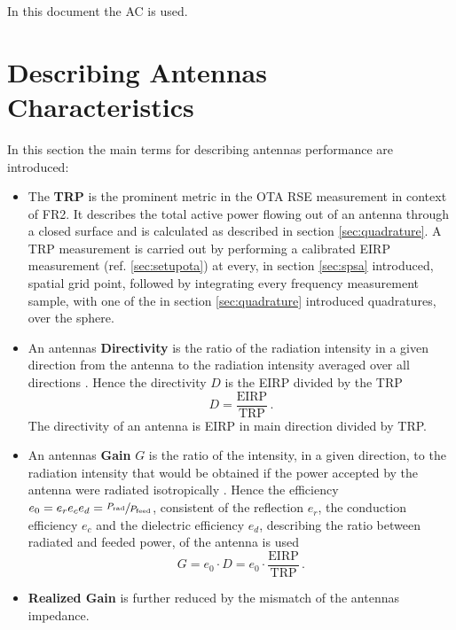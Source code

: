 In this document the \ac{AC} is used.

\section{Describing Antennas Characteristics}
\label{sec:anch}
In this section the main terms for describing antennas performance are introduced: \cite{balanis}

\begin{itemize}
\item The \textbf{\acf{TRP}} is the prominent metric in the \ac{OTA} \ac{RSE} measurement in context of \ac{FR2}. It describes the total active power flowing out of an antenna through a closed surface and is calculated as described in section \ref{sec:quadrature}. A \ac{TRP} measurement is carried out by performing a calibrated \ac{EIRP} measurement (ref. \ref{sec:setupota}) at every, in section \ref{sec:spsa} introduced, spatial grid point, followed by integrating every frequency measurement sample, with one of the in section \ref{sec:quadrature} introduced quadratures, over the sphere.
\item An antennas \textbf{Directivity} is \glqq the ratio of the radiation intensity in a given direction from the antenna to the radiation intensity averaged over all directions\grqq{} \cite{ieeeantenna}. Hence the directivity $D$ is the \ac{EIRP} divided by the \ac{TRP}
\begin{equation}
D = \frac{\text{EIRP}}{\text{TRP}}\,.
\end{equation}
The directivity of an antenna is \ac{EIRP} in main direction divided by \ac{TRP}.
\item An antennas \textbf{Gain} $G$ is \glqq the ratio of the intensity, in a given direction, to the radiation intensity that would be obtained if the power accepted by the antenna were radiated isotropically\grqq{} \cite{ieeeantenna}. Hence the efficiency $e_0=e_re_ce_d=\sfrac{P_\text{rad}}{P_\text{feed}}$, consistent of the reflection $e_r$, the conduction efficiency $e_c$ and the dielectric efficiency $e_d$, describing the ratio between radiated and feeded power, of the antenna is used
\begin{equation}
G = e_0\cdot D=e_0\cdot\frac{\text{EIRP}}{\text{TRP}}\,.
\end{equation}
\item \textbf{Realized Gain} is further reduced by the mismatch of the antennas impedance. \cite{ieeeantenna}
\end{itemize}

